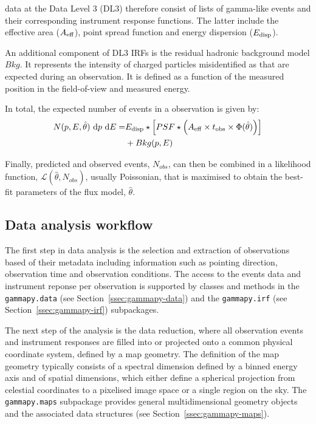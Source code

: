 \documentclass[traditabstract, longauth]{aa}
\newcommand{\code}[1]{\texttt{#1}}
\begin{document}
\gammaray data at the Data Level 3 (DL3) therefore consist of lists of gamma-like events and their
corresponding instrument response functions. The latter include the effective area ($A_{\rm eff}$),
point spread function and energy dispersion ($E_{\rm disp}$).

An additional component of DL3 IRFs is the residual hadronic background model $Bkg$.
It represents the intensity of charged particles misidentified as \gammarays that are expected
during an observation. It is defined as a function of the measured position in the field-of-view
and measured energy.

In total, the expected number of events in a \gammaray observation is given by:
\begin{align}
  N(p, E, \hat{\theta})\ {\rm d}p\ {\rm d}E =  &E_{\rm disp} \star \left[ PSF \star \left( A_{\rm eff} \times t_{\rm obs} \times \Phi(\hat{\theta}) \right) \right]\\
                       & + Bkg(p, E)
\end{align}

Finally, predicted and observed events, $N_{obs}$, can then be combined in a likelihood function,
$\mathcal{L}(\hat{\theta}, N_{obs})$, usually Poissonian, that is maximised to obtain the best-fit parameters of the flux model, $\hat{\theta}$.

\subsection{Data analysis workflow}
The first step in \gammaray data analysis is the selection and extraction of observations
based of their metadata including information such as pointing direction, observation
time and observation conditions. The access to the events data and instrument 
reponse per observation is supported by classes and methods
in the \code{gammapy.data} (see Section~\ref{ssec:gammapy-data}) and the \code{gammapy.irf}
(see Section~\ref{ssec:gammapy-irf}) subpackages.

The next step of the analysis is the data reduction, where all observation events and instrument
responses are filled into or projected onto a common physical coordinate system, defined by
a map geometry. The definition of the map geometry typically consists of a spectral dimension
defined by a binned energy axis and of spatial dimensions, which either define 
a spherical projection from celestial coordinates to a pixelised image space
or a single region on the sky. The \code{gammapy.maps} subpackage provides
general multidimensional geometry objects and the associated data structures
(see Section~\ref{ssec:gammapy-maps}).
\end{document}
